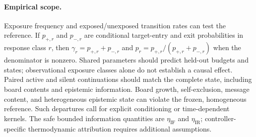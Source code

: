 \paragraph{Empirical scope.}
Exposure frequency and exposed/unexposed transition rates can test the
reference. If $p_{+,r}$ and $p_{-,r}$ are conditional target-entry and exit
probabilities in response class $r$, then
$\gamma_r=p_{+,r}+p_{-,r}$ and
$p_r=p_{+,r}/(p_{+,r}+p_{-,r})$ when the denominator is nonzero.
Shared parameters should predict held-out budgets and states; observational
exposure classes alone do not establish a causal effect. Paired active and
silent continuations should match the complete state, including board contents
and epistemic information. Board growth, self-exclusion, message content, and
heterogeneous epistemic state can violate the frozen, homogeneous reference.
Such departures call for explicit conditioning or time-dependent kernels.
The safe bounded information quantities are $\eta_{\mathrm{IF}}$ and
$\eta_{\mathrm{IR}}$; controller-specific thermodynamic attribution requires
additional assumptions.
